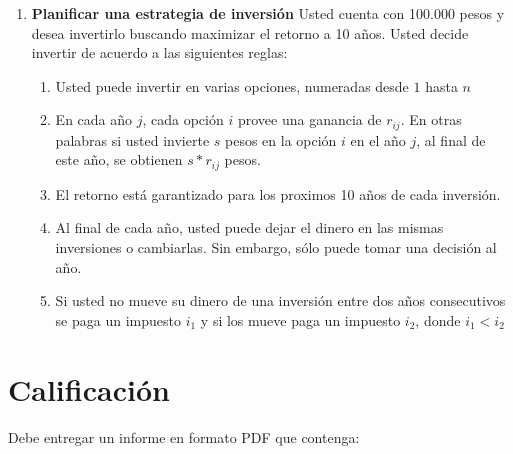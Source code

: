 \documentclass[twocolumn, letterpaper]{article}
\begin{document}
\begin{enumerate}
	\item \textbf{Planificar una estrategia de inversión} Usted cuenta con 100.000 pesos y desea invertirlo buscando maximizar el retorno a 10 años. Usted decide invertir de acuerdo a las siguientes reglas:
	\begin{enumerate}
		\item Usted puede invertir en varias opciones, numeradas desde $1$ hasta $n$
		\item En cada año $j$, cada opción $i$ provee una ganancia de $r_{ij}$. En otras palabras si usted invierte $s$ pesos en la opción $i$ en el año $j$, al final de este año, se obtienen $s*r_{ij}$ pesos. 
		\item El retorno está garantizado para los proximos 10 años de cada inversión.
		\item Al final de cada año, usted puede dejar el dinero en las mismas inversiones o cambiarlas. Sin embargo, sólo puede tomar una decisión al año.
		\item Si usted no mueve su dinero de una inversión entre dos años consecutivos se paga un impuesto $i_1$ y si los mueve paga un impuesto $i_2$, donde $i_1 < i_2$
\end{enumerate}				
\end{enumerate}

\section{Calificación}

Debe entregar un informe en formato PDF que contenga:
\end{document}
